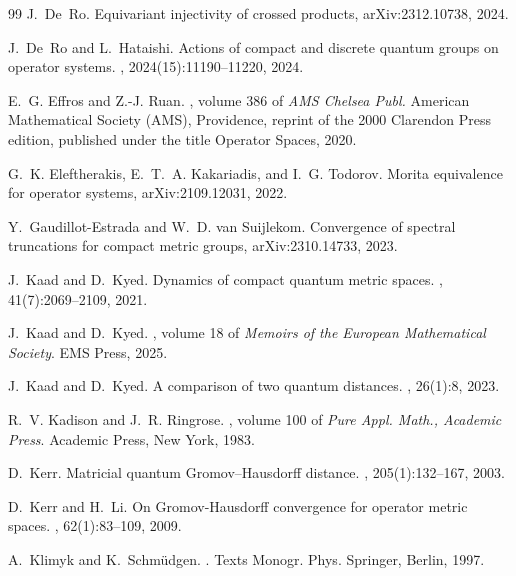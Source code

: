 \documentclass{amsart}
\theoremstyle{plain}
\theoremstyle{definition}
\theoremstyle{remark}
\begin{document}
\begin{thebibliography}{99}
		J.~De~Ro.
		\newblock Equivariant injectivity of crossed products, arXiv:2312.10738, 2024.
		
		J.~De~Ro and L.~Hataishi.
		\newblock Actions of compact and discrete quantum groups on operator systems.
		,
		2024(15):11190--11220, 2024.
		
		E.~G. Effros and Z.-J. Ruan.
		, volume 386 of {\em {{AMS Chelsea Publ}}.}
		\newblock American Mathematical Society (AMS), Providence, reprint of the 2000 Clarendon Press edition, published under the title Operator Spaces, 2020.
		
		G.~K. Eleftherakis, E.~T.~A. Kakariadis, and I.~G. Todorov.
		\newblock Morita equivalence for operator systems, arXiv:2109.12031, 2022.
		
		Y.~{Gaudillot-Estrada} and W.~D. {van Suijlekom}.
		\newblock Convergence of spectral truncations for compact metric groups, arXiv:2310.14733, 2023.
		
		J.~Kaad and D.~Kyed.
		\newblock Dynamics of compact quantum metric spaces.
		, 41(7):2069--2109, 2021.
		
		J.~Kaad and D.~Kyed.
		,
		\newblock volume 18 of {\em Memoirs of the European Mathematical Society}. EMS Press, 2025.
		
		J.~Kaad and D.~Kyed.
		\newblock A comparison of two quantum distances.
		, 26(1):8, 2023.
		
		R.~V. Kadison and J.~R. Ringrose.
		, volume 100 of {\em Pure Appl. {{Math}}., Academic
			Press}.
		\newblock Academic Press, New York, 1983.
		
		D.~Kerr.
		\newblock Matricial quantum {{Gromov}}--{{Hausdorff}} distance.
		, 205(1):132--167, 2003.
		
		D.~Kerr and H.~Li.
		\newblock On {{Gromov-Hausdorff}} convergence for operator metric spaces.
		, 
		62(1):83--109, 2009.
		
		A.~Klimyk and K.~Schm{\"u}dgen.
		.
		\newblock Texts {{Monogr}}. {{Phys}}. Springer, Berlin, 1997.
		

\end{thebibliography}
\end{document}

